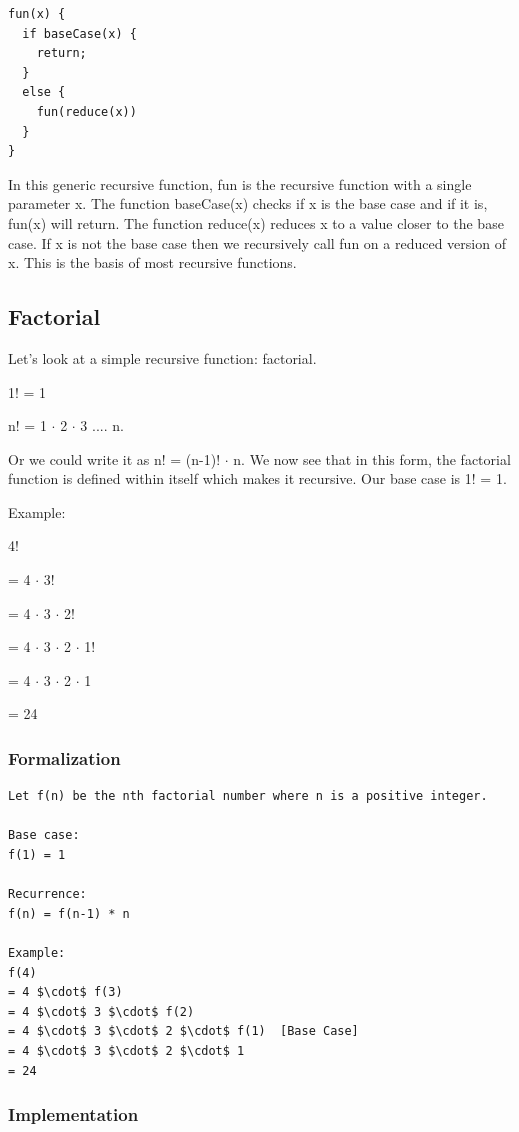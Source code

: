 \documentclass[11pt,oneside]{book}
\begin{document}
\begin{lstlisting}
fun(x) {
  if baseCase(x) {
    return;
  }
  else {
    fun(reduce(x))
  }
}
\end{lstlisting}

In this generic recursive function, fun is the recursive function with a single parameter x. The function baseCase(x) checks if x is the base case and if it is, fun(x) will return. The function reduce(x) reduces x to a value closer to the base case. If x is not the base case then we recursively call fun on a reduced version of x. This is the basis of most recursive functions.

\subsection{Factorial}

Let's look at a simple recursive function: factorial.

1! = 1

n! = 1 $\cdot$ 2 $\cdot$ 3 .... n.

Or we could write it as n! = (n-1)! $\cdot$ n. We now see that in this form, the factorial function is defined within itself which makes it recursive. Our base case is 1! = 1.

Example:

4!

= 4 $\cdot$ 3!

= 4 $\cdot$ 3 $\cdot$ 2!

= 4 $\cdot$ 3 $\cdot$ 2 $\cdot$ 1!

= 4 $\cdot$ 3 $\cdot$ 2 $\cdot$ 1

= 24

\subsubsection{Formalization}

\begin{lstlisting}
Let f(n) be the nth factorial number where n is a positive integer.

Base case:
f(1) = 1

Recurrence:
f(n) = f(n-1) * n

Example:
f(4) 
= 4 $\cdot$ f(3)
= 4 $\cdot$ 3 $\cdot$ f(2)
= 4 $\cdot$ 3 $\cdot$ 2 $\cdot$ f(1)  [Base Case]
= 4 $\cdot$ 3 $\cdot$ 2 $\cdot$ 1
= 24
\end{lstlisting}

\subsubsection{Implementation}
\end{document}
